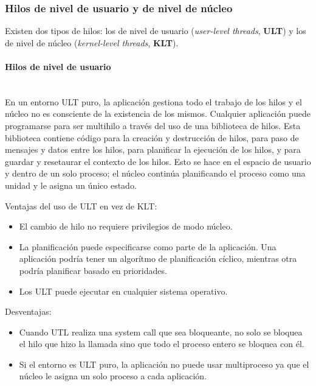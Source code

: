 \documentclass[12pt]{article}
\begin{document}
  \subsubsection{Hilos de nivel de usuario y de nivel de núcleo}
  Existen dos tipos de hilos: los de nivel de usuario (\textit{user-level threads}, \textbf{ULT}) y los de nivel de núcleo (\textit{kernel-level threads}, \textbf{KLT}).

  \paragraph{Hilos de nivel de usuario}\mbox{}\\
  En un entorno ULT puro, la aplicación gestiona todo el trabajo de los hilos y el núcleo no es consciente de la existencia de los mismos. Cualquier aplicación puede programarse para ser multihilo a través del uso de una biblioteca de hilos. Esta biblioteca contiene código para la creación y destrucción de hilos, para paso de mensajes y datos entre los hilos, para planificar la ejecución de los hilos, y para guardar y resetaurar el contexto de los hilos. Esto se hace en el espacio de usuario y dentro de un solo proceso; el núcleo continúa planificando el proceso como una unidad y le asigna un único estado.

  Ventajas del uso de ULT en vez de KLT:
  \begin{itemize}
    \item El cambio de hilo no requiere privilegios de modo núcleo.

    \item La planificación puede especificarse como parte de la aplicación. Una aplicación podría tener un algorítmo de planificación cíclico, mientras otra podría planificar basado en prioridades.

    \item Los ULT puede ejecutar en cualquier sistema operativo.
  \end{itemize}

  Desventajas:
  \begin{itemize}
    \item Cuando UTL realiza una system call que sea bloqueante, no solo se bloquea el hilo que hizo la llamada sino que todo el proceso entero se bloquea con él.

    \item Si el entorno es ULT puro, la aplicación no puede usar multiproceso ya que el núcleo le asigna un solo proceso a cada aplicación.
  \end{itemize}
\end{document}
